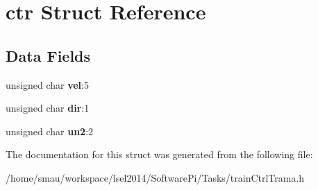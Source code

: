 \hypertarget{structctr}{\section{ctr Struct Reference}
\label{structctr}
}
\subsection*{Data Fields}
\begin{DoxyCompactItemize}
\item 
\hypertarget{structctr_a240ba6c57103ae118c29546daea7f98b}{unsigned char {\bfseries vel}\-:5}\label{structctr_a240ba6c57103ae118c29546daea7f98b}

\item 
\hypertarget{structctr_aacd350fbef9d8366a137aed382e58309}{unsigned char {\bfseries dir}\-:1}\label{structctr_aacd350fbef9d8366a137aed382e58309}

\item 
\hypertarget{structctr_a1346db863f6f134e51ea4dbeeb1d345a}{unsigned char {\bfseries un2}\-:2}\label{structctr_a1346db863f6f134e51ea4dbeeb1d345a}

\end{DoxyCompactItemize}


The documentation for this struct was generated from the following file\-:\begin{DoxyCompactItemize}
\item 
/home/smau/workspace/lsel2014/\-Software\-Pi/\-Tasks/train\-Ctrl\-Trama.\-h\end{DoxyCompactItemize}
